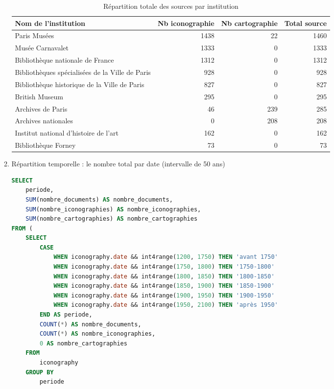 \begin{enumerate}
\begin{enumerate}
\begin{table}
\begin{tabular}{|l|r|r|r|}
\centering
\toprule
\textbf{Nom de l'institution} & \textbf{Nb iconographie} & \textbf{Nb cartographie} & \textbf{Total source} \\
\midrule
Paris Musées & 1438 & 22 & 1460 \\
Musée Carnavalet & 1333 & 0 & 1333 \\
Bibliothèque nationale de France & 1312 & 0 & 1312 \\
Bibliothèques spécialisées de la Ville de Paris & 928 & 0 & 928 \\
Bibliothèque historique de la Ville de Paris & 827 & 0 & 827 \\
British Museum & 295 & 0 & 295 \\
Archives de Paris & 46 & 239 & 285 \\
Archives nationales & 0 & 208 & 208 \\
Institut national d'histoire de l'art & 162 & 0 & 162 \\
Bibliothèque Forney & 73 & 0 & 73 \\
\bottomrule
\end{tabular}
\caption{Répartition totale des sources par institution}
\label{tab:resources}
\end{table}

\newpage 

        \item Répartition temporelle : le nombre total par date (intervalle de 50 ans)
            \begin{lstlisting}[language=SQL, caption=Nombre de sources par date (50 ans)]
SELECT
    periode,
    SUM(nombre_documents) AS nombre_documents,
    SUM(nombre_iconographies) AS nombre_iconographies,
    SUM(nombre_cartographies) AS nombre_cartographies
FROM (
    SELECT 
        CASE 
            WHEN iconography.date && int4range(1200, 1750) THEN 'avant 1750'
            WHEN iconography.date && int4range(1750, 1800) THEN '1750-1800'
            WHEN iconography.date && int4range(1800, 1850) THEN '1800-1850'
            WHEN iconography.date && int4range(1850, 1900) THEN '1850-1900'
            WHEN iconography.date && int4range(1900, 1950) THEN '1900-1950'
            WHEN iconography.date && int4range(1950, 2100) THEN 'après 1950'
        END AS periode,
        COUNT(*) AS nombre_documents,
        COUNT(*) AS nombre_iconographies,
        0 AS nombre_cartographies
    FROM 
        iconography
    GROUP BY 
        periode


\end{lstlisting}
\end{enumerate}
\end{enumerate}
